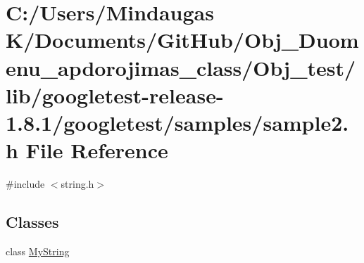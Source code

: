 \hypertarget{_obj__test_2lib_2googletest-release-1_88_81_2googletest_2samples_2sample2_8h}{}\section{C\+:/\+Users/\+Mindaugas K/\+Documents/\+Git\+Hub/\+Obj\+\_\+\+Duomenu\+\_\+apdorojimas\+\_\+class/\+Obj\+\_\+test/lib/googletest-\/release-\/1.8.1/googletest/samples/sample2.h File Reference}
\label{_obj__test_2lib_2googletest-release-1_88_81_2googletest_2samples_2sample2_8h}
{\ttfamily \#include $<$string.\+h$>$}\newline
\subsection*{Classes}
\begin{DoxyCompactItemize}
\item 
class \mbox{\hyperlink{class_my_string}{My\+String}}
\end{DoxyCompactItemize}
